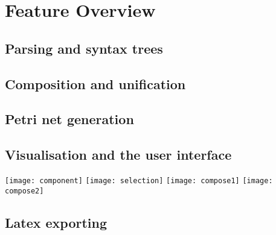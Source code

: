 \documentclass[../Dissertation.tex]{subfiles}
\begin{document}
\section{Feature Overview}
\subsection{Parsing and syntax trees}
\subsection{Composition and unification}
\subsection{Petri net generation}
\subsection{Visualisation and the user interface}

\texttt{[image: component]}
\texttt{[image: selection]}
\texttt{[image: compose1]}
\texttt{[image: compose2]}

\subsection{Latex exporting}
\end{document}
